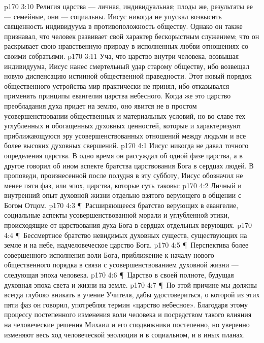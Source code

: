 \vs p170 3:10 Религия царства --- личная, индивидуальная; плоды же, результаты ее --- семейные, они --- социальны. Иисус никогда не упускал возвысить священность индивидуума в противоположность обществу. Однако он также признавал, что человек развивает свой характер бескорыстным служением; что он раскрывает свою нравственную природу в исполненных любви отношениях со своими собратьями.
\vs p170 3:11 Уча, что царство внутри человека, возвышая индивидуума, Иисус нанес смертельный удар старому обществу, ибо возвещал новую диспенсацию истинной общественной праведности. Этот новый порядок общественного устройства мир практически не принял, ибо отказывался применять принципы евангелия царства небесного. Когда же это царство преобладания духа придет на землю, оно явится не в простом усовершенствовании общественных и материальных условий, но во славе тех углубленных и обогащенных духовных ценностей, которые и характеризуют приближающуюся эру усовершенствованных отношений между людьми и все более высоких духовных свершений.
\vs p170 4:1 Иисус никогда не давал точного определения царства. В одно время он рассуждал об одной фазе царства, а в другое говорил об ином аспекте братства царствования Бога в сердцах людей. В проповеди, произнесенной после полудня в эту субботу, Иисус обозначил не менее пяти фаз, или эпох, царства, которые суть таковы:
\vs p170 4:2 \bibnobreakspace Личный и внутренний опыт духовной жизни отдельно взятого верующего в общении с Богом Отцом.
\vs p170 4:3 \P\ \bibnobreakspace Расширяющееся братство верующих в евангелие, социальные аспекты усовершенствованной морали и углубленной этики, происходящие от царствования духа Бога в сердцах отдельных верующих.
\vs p170 4:4 \P\ \bibnobreakspace Бессмертное братство невидимых духовных существ, существующих на земле и на небе, надчеловеческое царство Бога.
\vs p170 4:5 \P\ \bibnobreakspace Перспектива более совершенного исполнения воли Бога, приближение к началу нового общественного порядка в связи с усовершенствованием духовной жизни --- следующая эпоха человека.
\vs p170 4:6 \P\ \bibnobreakspace Царство в своей полноте, будущая духовная эпоха света и жизни на земле.
\vs p170 4:7 \P\ По этой причине мы должны всегда глубоко вникать в учение Учителя, дабы удостовериться, о которой из этих пяти фаз он говорил, употребляя термин «царство небесное». Благодаря этому процессу постепенного изменения воли человека и посредством такого влияния на человеческие решения Михаил и его сподвижники постепенно, но уверенно изменяют весь ход человеческой эволюции и в социальном, и в иных планах.
